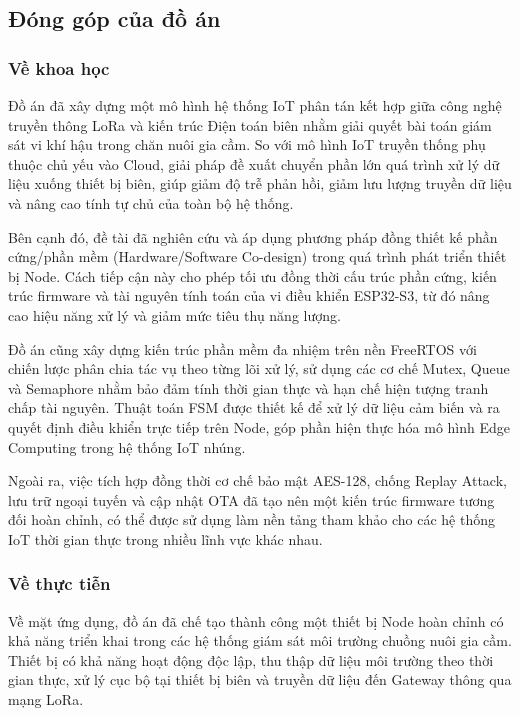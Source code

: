 \subsection{Đóng góp của đồ án}

\subsubsection{Về khoa học}

Đồ án đã xây dựng một mô hình hệ thống IoT phân tán kết hợp giữa công nghệ truyền thông LoRa và kiến trúc Điện toán biên nhằm giải quyết bài toán giám sát vi khí hậu trong chăn nuôi gia cầm. So với mô hình IoT truyền thống phụ thuộc chủ yếu vào Cloud, giải pháp đề xuất chuyển phần lớn quá trình xử lý dữ liệu xuống thiết bị biên, giúp giảm độ trễ phản hồi, giảm lưu lượng truyền dữ liệu và nâng cao tính tự chủ của toàn bộ hệ thống.

Bên cạnh đó, đề tài đã nghiên cứu và áp dụng phương pháp đồng thiết kế phần cứng/phần mềm (Hardware/Software Co-design) trong quá trình phát triển thiết bị Node. Cách tiếp cận này cho phép tối ưu đồng thời cấu trúc phần cứng, kiến trúc firmware và tài nguyên tính toán của vi điều khiển ESP32-S3, từ đó nâng cao hiệu năng xử lý và giảm mức tiêu thụ năng lượng.

Đồ án cũng xây dựng kiến trúc phần mềm đa nhiệm trên nền FreeRTOS với chiến lược phân chia tác vụ theo từng lõi xử lý, sử dụng các cơ chế Mutex, Queue và Semaphore nhằm bảo đảm tính thời gian thực và hạn chế hiện tượng tranh chấp tài nguyên. Thuật toán FSM được thiết kế để xử lý dữ liệu cảm biến và ra quyết định điều khiển trực tiếp trên Node, góp phần hiện thực hóa mô hình Edge Computing trong hệ thống IoT nhúng.

Ngoài ra, việc tích hợp đồng thời cơ chế bảo mật AES-128, chống Replay Attack, lưu trữ ngoại tuyến và cập nhật OTA đã tạo nên một kiến trúc firmware tương đối hoàn chỉnh, có thể được sử dụng làm nền tảng tham khảo cho các hệ thống IoT thời gian thực trong nhiều lĩnh vực khác nhau.

\subsubsection{Về thực tiễn}

Về mặt ứng dụng, đồ án đã chế tạo thành công một thiết bị Node hoàn chỉnh có khả năng triển khai trong các hệ thống giám sát môi trường chuồng nuôi gia cầm. Thiết bị có khả năng hoạt động độc lập, thu thập dữ liệu môi trường theo thời gian thực, xử lý cục bộ tại thiết bị biên và truyền dữ liệu đến Gateway thông qua mạng LoRa.

